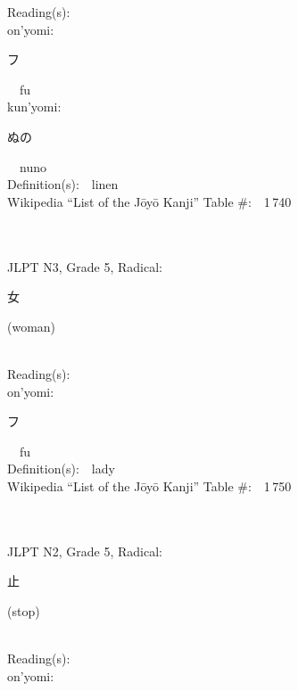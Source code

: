 \begin{multicols}{2}
Reading(s):\ \ \\
{\hspace*{1em}}on'yomi:\ \ \\
{\hspace*{2em}}{\begin{CJK}{UTF8}{min} フ \end{CJK}}\ \ fu\ \ \\
{\hspace*{1em}}kun'yomi:\ \ \\
{\hspace*{2em}}{\begin{CJK}{UTF8}{min} ぬの \end{CJK}}\ \ nuno\ \ \\
Definition(s):\ \ linen \\
Wikipedia ``List of the J\=oy\=o Kanji'' Table \#:\ \ 1\,740 \\
\ \ \\
{\fontsize{34pt}{40pt}  }\ \ \\  %
{JLPT N3, Grade 5, Radical:\ \ {\begin{CJK}{UTF8}{min} 女 \end{CJK}} (woman) } \\
Reading(s):\ \ \\
{\hspace*{1em}}on'yomi:\ \ \\
{\hspace*{2em}}{\begin{CJK}{UTF8}{min} フ \end{CJK}}\ \ fu\ \ \\
Definition(s):\ \ lady \\
Wikipedia ``List of the J\=oy\=o Kanji'' Table \#:\ \ 1\,750 \\
\ \ \\
{\fontsize{34pt}{40pt}  }\ \ \\  %
{JLPT N2, Grade 5, Radical:\ \ {\begin{CJK}{UTF8}{min} 止 \end{CJK}} (stop) } \\
Reading(s):\ \ \\
{\hspace*{1em}}on'yomi:\ \ \\

\end{multicols}
